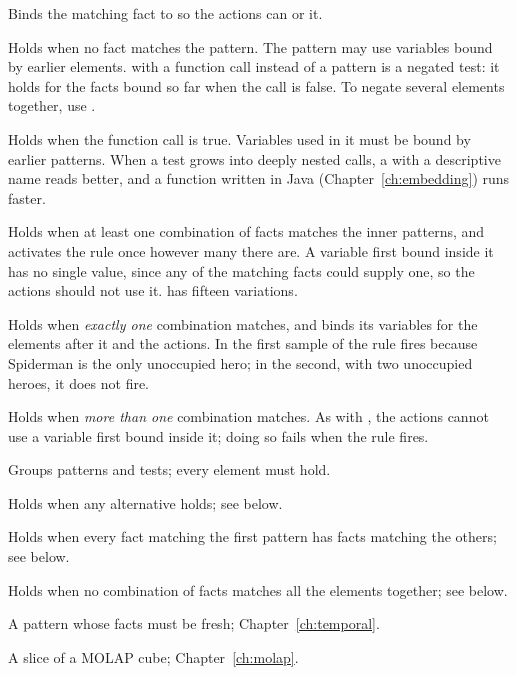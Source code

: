 \begin{description}[style=nextline]
\item[\fn{?f <- (pattern)}] Binds the matching fact to  so the
  actions can  or  it.
\item[\fn{(not (pattern))}] Holds when no fact matches the pattern. The
  pattern may use variables bound by earlier elements. 
  with a function call instead of a pattern is a negated test: it holds
  for the facts bound so far when the call is false. To negate several
  elements together, use .
\item[\fn{(test (expr))}] Holds when the function call is true. Variables
  used in it must be bound by earlier patterns. When a test grows into
  deeply nested calls, a  with a descriptive name reads
  better, and a function written in Java (Chapter~\ref{ch:embedding})
  runs faster.
\item[\fn{(exists (pattern)...)}] Holds when at least one combination of
  facts matches the inner patterns, and activates the rule once however
  many there are. A variable first bound inside it has no single value,
  since any of the matching facts could supply one, so the actions should
  not use it.  has fifteen variations.
\item[\fn{(only (pattern)...)}] Holds when \emph{exactly one} combination
  matches, and binds its variables for the elements after it and the
  actions. In the first sample of
   the rule fires because Spiderman is the only
  unoccupied hero; in the second, with two unoccupied heroes, it does
  not fire.
\item[\fn{(multiple (pattern)...)}] Holds when \emph{more than one}
  combination matches. As with , the actions cannot use a
  variable first bound inside it; doing so fails when the rule fires.
\item[\fn{(and ...)}] Groups patterns and tests; every element must hold.
\item[\fn{(or ...)}] Holds when any alternative holds; see below.
\item[\fn{(forall (pattern) (pattern)...)}] Holds when every fact matching
  the first pattern has facts matching the others; see below.
\item[\fn{(not (and CE+))}] Holds when no combination of facts matches
  all the elements together; see below.
\item[\fn{(temporal ...)}] A pattern whose facts must be fresh; Chapter~\ref{ch:temporal}.
\item[\fn{(cubequery ...)}] A slice of a MOLAP cube; Chapter~\ref{ch:molap}.
\end{description}

